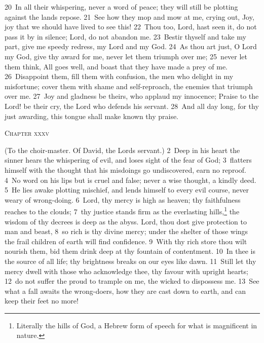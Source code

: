 \documentclass[10pt]{book} %
\begin{document}
\textcolor{benred8}{20}~In all their whispering, never a word of peace; they will still be plotting against the land\textquotesingle s repose. \textcolor{benred8}{21}~See how they mop and mow at me, crying out, Joy, joy that we should have lived to see this! \textcolor{benred8}{22}~Thou too, Lord, hast seen it, do not pass it by in silence; Lord, do not abandon me. \textcolor{benred8}{23}~Bestir thyself and take my part, give me speedy redress, my Lord and my God. \textcolor{benred8}{24}~As thou art just, O Lord my God, give thy award for me, never let them triumph over me; \textcolor{benred8}{25}~never let them think, All goes well, and boast that they have made a prey of me. \textcolor{benred8}{26}~Disappoint them, fill them with confusion, the men who delight in my misfortune; cover them with shame and self-reproach, the enemies that triumph over me. \textcolor{benred8}{27}~Joy and gladness be theirs, who applaud my innocence; Praise to the Lord! be their cry, the Lord who defends his servant. \textcolor{benred8}{28}~And all day long, for thy just awarding, this tongue shall make known thy praise.
\begin{large}\begin{center}\textsc{Chapter xxxv}\end{center}\end{large}
(To the choir-master. Of David, the Lord\textquotesingle s servant.)
\textcolor{benred8}{2}~Deep in his heart the sinner hears the whispering of evil, and loses sight of the fear of God; \textcolor{benred8}{3}~flatters himself with the thought that his misdoings go undiscovered, earn no reproof. \textcolor{benred8}{4}~No word on his lips but is cruel and false; never a wise thought, a kindly deed. \textcolor{benred8}{5}~He lies awake plotting mischief, and lends himself to every evil course, never weary of wrong-doing.
\textcolor{benred8}{6}~Lord, thy mercy is high as heaven; thy faithfulness reaches to the clouds; \textcolor{benred8}{7}~thy justice stands firm as the everlasting hills,\footnote[1]{Literally \textasciigrave the hills of God\textquotesingle , a Hebrew form of speech for what is magnificent in nature.} the wisdom of thy decrees is deep as the abyss. Lord, thou dost give protection to man and beast, \textcolor{benred8}{8}~so rich is thy divine mercy; under the shelter of those wings the frail children of earth will find confidence. \textcolor{benred8}{9}~With thy rich store thou wilt nourish them, bid them drink deep at thy fountain of contentment. \textcolor{benred8}{10}~In thee is the source of all life; thy brightness breaks on our eyes like dawn. \textcolor{benred8}{11}~Still let thy mercy dwell with those who acknowledge thee, thy favour with upright hearts; \textcolor{benred8}{12}~do not suffer the proud to trample on me, the wicked to dispossess me. \textcolor{benred8}{13}~See what a fall awaits the wrong-doers, how they are cast down to earth, and can keep their feet no more!
\end{document}

